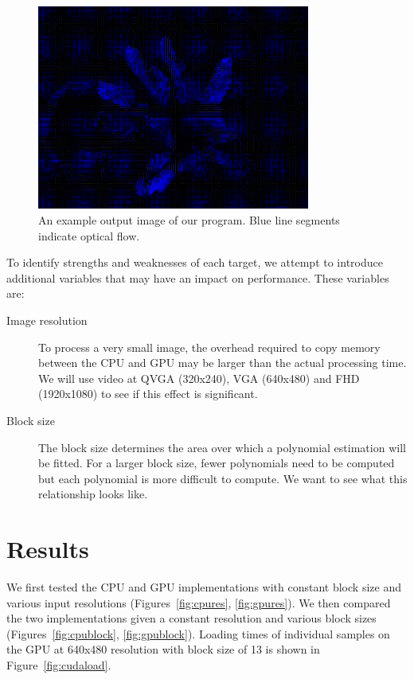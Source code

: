 \documentclass[12pt,letterpaper]{article}
\begin{document}
\begin{figure}[h]
  \centering
  \includegraphics[width=0.8\textwidth]{img/flow.png}
  \caption{An example output image of our program. Blue line segments indicate optical flow.}
  \label{fig:flow}
\end{figure}

To identify strengths and weaknesses of each target, we attempt to
introduce additional variables that may have an impact on performance. These
variables are:

\begin{description}
  \item[Image resolution] To process a very small image, the overhead required
    to copy memory between the CPU and GPU may be larger than the actual
    processing time. We will use video at QVGA (320x240), VGA (640x480) and FHD
    (1920x1080) to see if this effect is significant.
  \item[Block size] The block size determines the area over which a polynomial
    estimation will be fitted. For a larger block size, fewer polynomials need
    to be computed but each polynomial is more difficult to compute. We want to
    see what this relationship looks like.
\end{description}

\section{Results}
We first tested the CPU and GPU implementations with constant block size and
various input resolutions (Figures~\ref{fig:cpures}, \ref{fig:gpures}). We then
compared the two implementations given a constant resolution and various block
sizes (Figures~\ref{fig:cpublock}, \ref{fig:gpublock}). Loading times of
individual samples on the GPU at 640x480 resolution with block size of 13 is
shown in Figure~\ref{fig:cudaload}.
\end{document}
